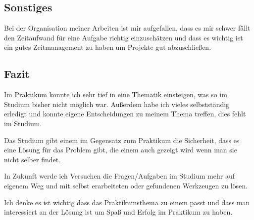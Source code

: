 \documentclass[pdftex,12pt,a4paper]{scrartcl}
\begin{document}
\subsection{Sonstiges}
Bei der Organisation meiner Arbeiten ist mir aufgefallen, dass es mir schwer fällt den Zeitaufwand für eine Aufgabe richtig einzuschätzen und dass es wichtig ist ein gutes Zeitmanagement zu haben um Projekte gut abzuschließen.
\subsection{Fazit}
Im Praktikum konnte ich sehr tief in eine Thematik einsteigen, was so im Studium bisher nicht möglich war. Außerdem habe ich vieles selbstständig erledigt und konnte eigene Entscheidungen zu meinem Thema treffen, dies fehlt im Studium.

Das Studium gibt einem im Gegensatz zum Praktikum die Sicherheit, dass es eine Lösung für das Problem gibt, die einem auch gezeigt wird wenn man sie nicht selber findet.

In Zukunft werde ich Versuchen die Fragen/Aufgaben im Studium mehr auf eigenem Weg und mit selbst erarbeiteten oder gefundenen Werkzeugen zu lösen.

Ich denke es ist wichtig dass das Praktikumsthema zu einem passt und dass man interessiert an der Lösung ist um Spaß und Erfolg im Praktikum zu haben.

\appendix

\end{document}
